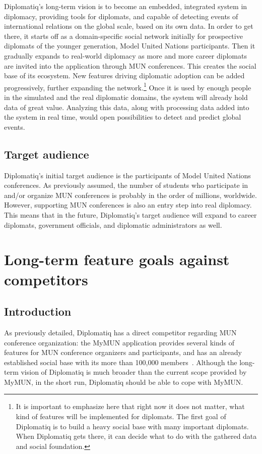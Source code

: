 Diplomatiq's long-term vision is to become an embedded, integrated system in diplomacy, providing tools for diplomats, and capable of detecting events of international relations on the global scale, based on its own data. In order to get there, it starts off as a domain-specific social network initially for prospective diplomats of the younger generation, Model United Nations participants. Then it gradually expands to real-world diplomacy as more and more career diplomats are invited into the application through MUN conferences. This creates the social base of its ecosystem. New features driving diplomatic adoption can be added progressively, further expanding the network.\footnote{It is important to emphasize here that right now it does not matter, what kind of features will be implemented for diplomats. The first goal of Diplomatiq is to build a heavy social base with many important diplomats. When Diplomatiq gets there, it can decide what to do with the gathered data and social foundation.} Once it is used by enough people in the simulated and the real diplomatic domains, the system will already hold data of great value. Analyzing this data, along with processing data added into the system in real time, would open possibilities to detect and predict global events.

\subsection{Target audience}

Diplomatiq's initial target audience is the participants of Model United Nations conferences. As previously assumed, the number of students who participate in and/or organize MUN conferences is probably in the order of millions, worldwide. However, supporting MUN conferences is also an entry step into real diplomacy. This means that in the future, Diplomatiq's target audience will expand to career diplomats, government officials, and diplomatic administrators as well.

\section{Long-term feature goals against competitors}

\subsection{Introduction}

As previously detailed, Diplomatiq has a direct competitor regarding MUN conference organization: the MyMUN application provides several kinds of features for MUN conference organizers and participants, and has an already established social base with its more than 100,000 members~\cite{mymunwebsite}. Although the long-term vision of Diplomatiq is much broader than the current scope provided by MyMUN, in the short run, Diplomatiq should be able to cope with MyMUN.

